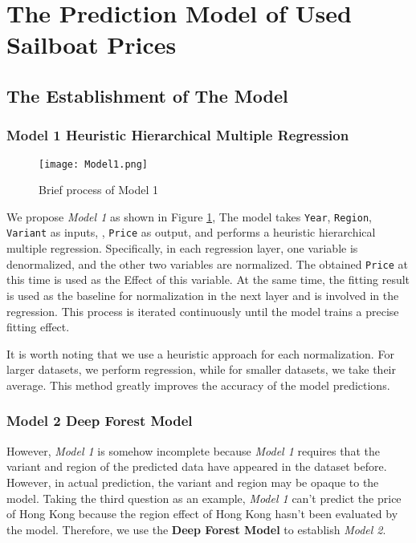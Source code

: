 \documentclass[12pt]{article}  %
\begin{document}
\section{The Prediction Model of Used Sailboat Prices}

\subsection{The Establishment of The Model}
\subsubsection{Model 1 \textemdash  Heuristic Hierarchical Multiple Regression}
\begin{figure}[htbp]
    \centering
    \texttt{[image: Model1.png]}
    \caption{Brief process of Model 1}\label{fig:Model1}
\end{figure}
We propose \emph{Model 1} as shown in Figure \ref{fig:Model1}, The model takes \texttt{Year}, \texttt{Region}, \texttt{Variant} as inputs, 
, \texttt{Price} as output, and performs a heuristic hierarchical multiple regression. 
Specifically, in each regression layer, one variable is denormalized, and the other two variables are normalized. 
The obtained \texttt{Price} at this time is used as the Effect of this variable. 
At the same time, the fitting result is used as the baseline for normalization in the next layer and is involved in the regression. 
This process is iterated continuously until the model trains a precise fitting effect.

It is worth noting that we use a heuristic approach for each normalization. 
For larger datasets, we perform regression, while for smaller datasets, we take their average. 
This method greatly improves the accuracy of the model predictions.
\subsubsection{Model 2 \textemdash  Deep Forest Model}
However, \emph{Model 1} is somehow incomplete because \emph{Model 1} requires that the variant and region of the predicted data have appeared in the dataset before. 
However, in actual prediction, the variant and region may be opaque to the model. 
Taking the third question as an example, \emph{Model 1} can't predict the price of Hong Kong because the region effect of Hong Kong hasn't been evaluated by the model. 
Therefore, we use the \textbf{Deep Forest Model} to establish \emph{Model 2}.
\end{document}
